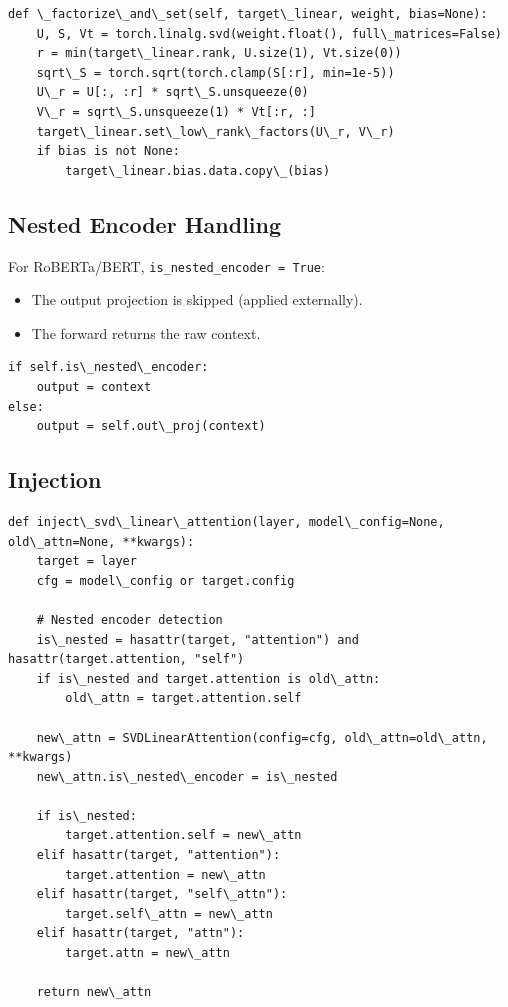 \begin{lstlisting}
def \_factorize\_and\_set(self, target\_linear, weight, bias=None):
    U, S, Vt = torch.linalg.svd(weight.float(), full\_matrices=False)
    r = min(target\_linear.rank, U.size(1), Vt.size(0))
    sqrt\_S = torch.sqrt(torch.clamp(S[:r], min=1e-5))
    U\_r = U[:, :r] * sqrt\_S.unsqueeze(0)
    V\_r = sqrt\_S.unsqueeze(1) * Vt[:r, :]
    target\_linear.set\_low\_rank\_factors(U\_r, V\_r)
    if bias is not None:
        target\_linear.bias.data.copy\_(bias)
\end{lstlisting}

\subsection{Nested Encoder Handling}

For RoBERTa/BERT, \texttt{is\_nested\_encoder = True}:
\begin{itemize}
\item The output projection is skipped (applied externally).
\item The forward returns the raw context.

\end{itemize}
\begin{lstlisting}
if self.is\_nested\_encoder:
    output = context
else:
    output = self.out\_proj(context)
\end{lstlisting}

\subsection{Injection}

\begin{lstlisting}
def inject\_svd\_linear\_attention(layer, model\_config=None, old\_attn=None, **kwargs):
    target = layer
    cfg = model\_config or target.config
    
    # Nested encoder detection
    is\_nested = hasattr(target, "attention") and hasattr(target.attention, "self")
    if is\_nested and target.attention is old\_attn:
        old\_attn = target.attention.self
    
    new\_attn = SVDLinearAttention(config=cfg, old\_attn=old\_attn, **kwargs)
    new\_attn.is\_nested\_encoder = is\_nested
    
    if is\_nested:
        target.attention.self = new\_attn
    elif hasattr(target, "attention"):
        target.attention = new\_attn
    elif hasattr(target, "self\_attn"):
        target.self\_attn = new\_attn
    elif hasattr(target, "attn"):
        target.attn = new\_attn
    
    return new\_attn
\end{lstlisting}

